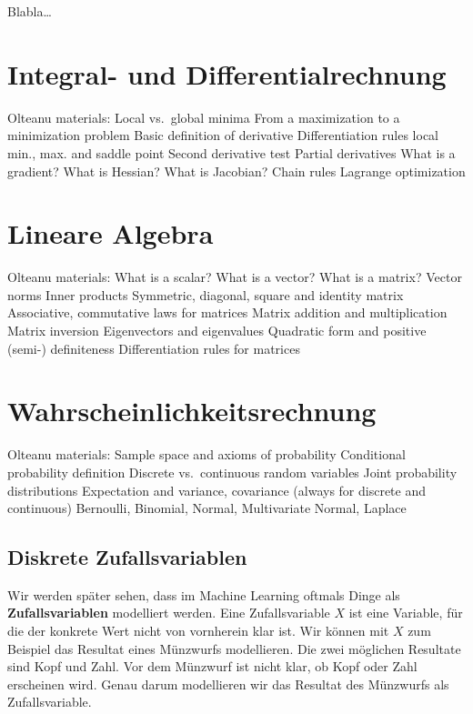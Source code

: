 \documentclass[
]{book}
\begin{document}
Blabla\ldots{}

\hypertarget{integral--und-differentialrechnung}{%
\section{Integral- und Differentialrechnung}\label{integral--und-differentialrechnung}}

Olteanu materials:
Local vs.~global minima
From a maximization to a minimization problem
Basic definition of derivative
Differentiation rules
local min., max. and saddle point
Second derivative test
Partial derivatives
What is a gradient? What is Hessian? What is Jacobian?
Chain rules
Lagrange optimization

\hypertarget{lineare-algebra}{%
\section{Lineare Algebra}\label{lineare-algebra}}

Olteanu materials:
What is a scalar? What is a vector? What is a matrix?
Vector norms
Inner products
Symmetric, diagonal, square and identity matrix
Associative, commutative laws for matrices
Matrix addition and multiplication
Matrix inversion
Eigenvectors and eigenvalues
Quadratic form and positive (semi-) definiteness
Differentiation rules for matrices

\hypertarget{wahrscheinlichkeitsrechnung}{%
\section{Wahrscheinlichkeitsrechnung}\label{wahrscheinlichkeitsrechnung}}

Olteanu materials:
Sample space and axioms of probability
Conditional probability definition
Discrete vs.~continuous random variables
Joint probability distributions
Expectation and variance, covariance (always for discrete and continuous)
Bernoulli, Binomial, Normal, Multivariate Normal, Laplace

\hypertarget{diskrete-zufallsvariablen}{%
\subsection{Diskrete Zufallsvariablen}\label{diskrete-zufallsvariablen}}

Wir werden später sehen, dass im Machine Learning oftmals Dinge als \textbf{Zufallsvariablen} modelliert werden. Eine Zufallsvariable \(X\) ist eine Variable, für die der konkrete Wert nicht von vornherein klar ist. Wir können mit \(X\) zum Beispiel das Resultat eines Münzwurfs modellieren. Die zwei möglichen Resultate sind Kopf und Zahl. Vor dem Münzwurf ist nicht klar, ob Kopf oder Zahl erscheinen wird. Genau darum modellieren wir das Resultat des Münzwurfs als Zufallsvariable.
\end{document}
